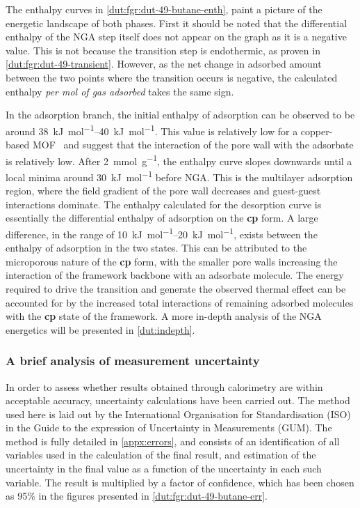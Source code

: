 The enthalpy curves in \autoref{dut:fgr:dut-49-butane-enth},
paint a picture of the energetic landscape of both phases.
First it should be noted that the differential enthalpy of
the NGA step itself does not appear on the graph as it is a
negative value. This is not because the transition step is 
endothermic, as proven in \autoref{dut:fgr:dut-49-transient}. 
However, as the net change in adsorbed amount between the two
points where the transition occurs is negative, the calculated
enthalpy \textit{per mol of gas adsorbed} takes the same sign.

In the adsorption branch, the initial enthalpy of adsorption 
can be observed to be around \SIrange{38}{40}{\kilo\joule\per\mol}.
This value is relatively low for a copper-based 
MOF~\cite{langeStructuralFlexibilityCopperbased2014} and suggest
that the interaction of the pore wall with the adsorbate is 
relatively low. After \SI{2}{\milli\mol\per\gram}, the enthalpy
curve slopes downwards until a local minima around 
\SI{30}{\kilo\joule\per\mol} before NGA. 
This is the multilayer adsorption region,
where the field gradient of the pore wall decreases and guest-guest 
interactions dominate.
The enthalpy calculated for the desorption curve is essentially the 
differential enthalpy of adsorption on the \textbf{cp} form. A large 
difference, in the range of \SIrange{10}{20}{\kilo\joule\per\mol}, exists
between the enthalpy of adsorption in the two states. This can be 
attributed to the microporous nature of the \textbf{cp} form, with the
smaller pore walls increasing the interaction of the framework backbone
with an adsorbate molecule. The energy required to drive the 
transition and generate the observed thermal effect can be accounted 
for by the increased total interactions of remaining adsorbed 
molecules with the \textbf{cp} state of the framework.
A more in-depth analysis of the NGA energetics will be presented 
in \autoref{dut:indepth}.

\subsubsection{A brief analysis of measurement uncertainty}

In order to assess whether results obtained through calorimetry
are within acceptable accuracy, uncertainty calculations have been
carried out. The method used here is laid out by the International 
Organisation for Standardisation (ISO) in the Guide to the expression
of Uncertainty in Measurements (GUM). The method is fully detailed 
in \autoref{appx:errors}, and consists of an identification of 
all variables used in the calculation of the final result, and 
estimation of the uncertainty in the final value as a function of
the uncertainty in each such variable. The result is multiplied
by a factor of confidence, which has been chosen as 95\% in the 
figures presented in \autoref{dut:fgr:dut-49-butane-err}.


